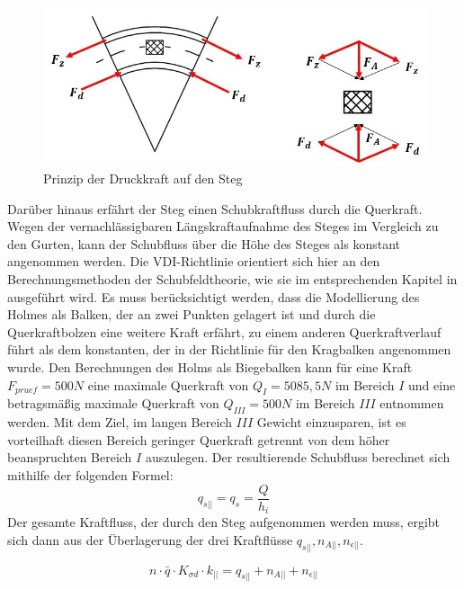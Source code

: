 \begin{figure}[h]
	\includegraphics[width=1.0\textwidth]{Bilder/Abtriebskraft.jpg}
	\caption{Prinzip der Druckkraft auf den Steg}
	\label{fig: Abtriebskraft}
\end{figure}
\noindent Darüber hinaus erfährt der Steg einen Schubkraftfluss durch die Querkraft. Wegen der vernachlässigbaren Längskraftaufnahme des Steges im Vergleich zu den Gurten, kann der Schubfluss über die Höhe des Steges als konstant angenommen werden. Die VDI-Richtlinie orientiert sich hier an den Berechnungsmethoden der Schubfeldtheorie, wie sie im entsprechenden Kapitel in \cite{item15} ausgeführt wird. Es muss berücksichtigt werden, dass die Modellierung des Holmes als Balken, der an zwei Punkten gelagert ist und durch die Querkraftbolzen eine weitere Kraft erfährt, zu einem anderen Querkraftverlauf führt als dem konstanten, der in der Richtlinie für den Kragbalken angenommen wurde. Den Berechnungen des Holms als Biegebalken kann für eine Kraft $ F_{pruef}=500N $ eine maximale Querkraft von $ Q_{I}=5085,5N $ im Bereich $ I $ und eine betragsmäßig maximale Querkraft von $Q_{III}=500N $ im Bereich $ III $ entnommen werden. Mit dem Ziel, im langen Bereich $ III $ Gewicht einzusparen, ist es vorteilhaft diesen Bereich geringer Querkraft getrennt von dem höher beanspruchten Bereich $ I $ auszulegen. Der resultierende Schubfluss berechnet sich mithilfe der folgenden Formel:\\
\begin{equation}
	q_{s||}=q_{s}=\frac{Q}{h_{i}}
\end{equation}
Der gesamte Kraftfluss, der durch den Steg aufgenommen werden muss, ergibt sich dann aus der Überlagerung der drei Kraftflüsse $q_{s||}, n_{A||}, n_{\epsilon||} $. 

\begin{equation}
	n\cdot \bar{q}\cdot K_{\sigma d}\cdot k_{||}=q_{s||}+n_{A||}+n_{\epsilon||}
\end{equation}

